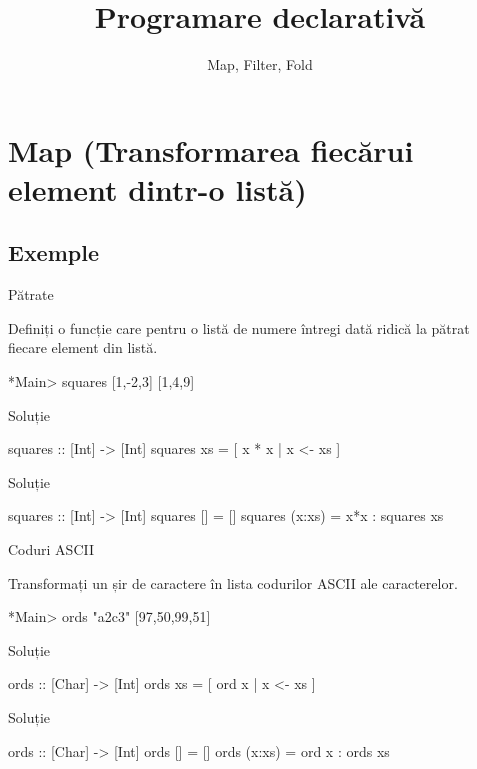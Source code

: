 \documentclass[handout,xcolor=pdftex,romanian,colorlinks]{beamer}
\title[PD---Funcții de ordin înalt]{Programare declarativă}
\subtitle{Map, Filter, Fold}
\begin{document}
\begin{frame}
  \titlepage
\end{frame}

\section{Map (Transformarea fiecărui element dintr-o listă)}

\subsection{Exemple}

\begin{frame}[fragile]{Pătrate}
\begin{block}{}
Definiți o funcție care pentru o listă de numere întregi dată  ridică la pătrat fiecare element din listă.
\begin{asciihs}
*Main> squares [1,-2,3]
[1,4,9]
\end{asciihs}
\end{block}
\begin{block}{Soluție }
\begin{asciihs}
squares :: [Int] -> [Int]
squares xs = [ x * x | x <- xs ]
\end{asciihs}
\end{block}
\begin{block}{Soluție }
\begin{asciihs}
squares :: [Int] -> [Int]
squares []     = []
squares (x:xs) = x*x : squares xs
\end{asciihs}
\end{block}
\end{frame}

\begin{frame}[fragile]
{Coduri ASCII}
\begin{block}{}
Transformați un șir de caractere în lista codurilor ASCII ale caracterelor.
\begin{asciihs}
*Main> ords "a2c3"
[97,50,99,51]
\end{asciihs}
\end{block}
\begin{block}{Soluție }
\begin{asciihs}
ords :: [Char] -> [Int]
ords xs = [ ord x | x <- xs ]
\end{asciihs}
\end{block}
\begin{block}{Soluție }
\begin{asciihs}
ords :: [Char] -> [Int]
ords []     = []
ords (x:xs) = ord x : ords xs
\end{asciihs}
\end{block}
\end{frame}
\end{document}
